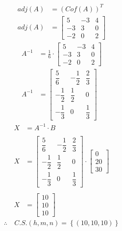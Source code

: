 \documentclass[10pt, a4paper]{article}
\begin{document}
\begin{multicols*}{2}
\begin{align*}
  adj\left(A\right) &= \left(Cof\left(A\right)\right)^T\\
  adj\left(A\right) &= \begin{bmatrix}
    5 & -3 & 4\\
    -3 & 3 & 0\\
    -2 & 0 & 2
  \end{bmatrix}
\end{align*}
\begin{align*}
  A^{-1} &= \frac{1}{6} \cdot \begin{bmatrix}
    5 & -3 & 4\\
    -3 & 3 & 0\\
    -2 & 0 & 2
  \end{bmatrix}\\
  A^{-1} &= \begin{bmatrix}
    \dfrac{5}{6} & -\dfrac{1}{2} & \dfrac{2}{3}\\[2ex]
    -\dfrac{1}{2} & \dfrac{1}{2} & 0\\[2ex]
    -\dfrac{1}{3} & 0 & \dfrac{1}{3}
  \end{bmatrix}
\end{align*}
\begin{align*}
  X &= A^{-1} \cdot B\\\\
  X &= \begin{bmatrix}
    \dfrac{5}{6} & -\dfrac{1}{2} & \dfrac{2}{3}\\[2ex]
    -\dfrac{1}{2} & \dfrac{1}{2} & 0\\[2ex]
    -\dfrac{1}{3} & 0 & \dfrac{1}{3}
  \end{bmatrix} \cdot \begin{bmatrix}
    0\\[2ex]
    20\\[2ex]
    30
  \end{bmatrix}\\\\
  X &= \begin{bmatrix}
    10\\[2ex]
    10\\[2ex]
    10
  \end{bmatrix}
\end{align*}
\begin{align*}
  \therefore \ &C.S. \left(h,m,n\right) = \left\{\left(10,10,10\right)\right\}
\end{align*}
\columnseprule=1pt
\end{multicols*}
\newpage
\end{document}
